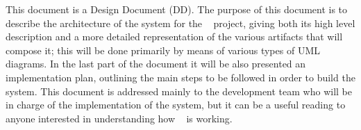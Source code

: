 This document is a Design Document (DD). The purpose of this document is to describe the architecture of the system for the \projectname~ project, giving both its high level description and a more detailed representation of the various artifacts that will compose it; this will be done primarily by means of various types of UML diagrams. In the last part of the document it will be also presented an implementation plan, outlining the main steps to be followed in order to build the system. This document is addressed mainly to the development team who will be in charge of the implementation of the system, but it can be a useful reading to anyone interested in understanding how \projectname~ is working.